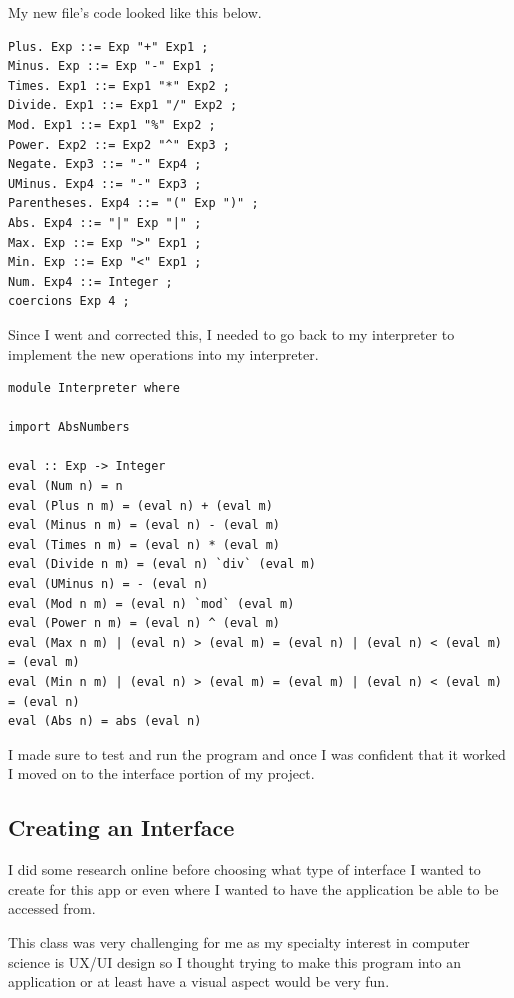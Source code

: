 \documentclass{article}
\begin{document}
\medskip\noindent 
My new file's code looked like this below. 

\medskip\noindent 
\begin{lstlisting}
Plus. Exp ::= Exp "+" Exp1 ;
Minus. Exp ::= Exp "-" Exp1 ;
Times. Exp1 ::= Exp1 "*" Exp2 ;
Divide. Exp1 ::= Exp1 "/" Exp2 ;
Mod. Exp1 ::= Exp1 "%" Exp2 ;
Power. Exp2 ::= Exp2 "^" Exp3 ;
Negate. Exp3 ::= "-" Exp4 ;
UMinus. Exp4 ::= "-" Exp3 ;
Parentheses. Exp4 ::= "(" Exp ")" ;
Abs. Exp4 ::= "|" Exp "|" ;
Max. Exp ::= Exp ">" Exp1 ;
Min. Exp ::= Exp "<" Exp1 ;
Num. Exp4 ::= Integer ;
coercions Exp 4 ;
\end{lstlisting}

\medskip\noindent 
Since I went and corrected this, I needed to go back to my interpreter to implement the new operations into my interpreter. 

\medskip\noindent 
\begin{lstlisting}
module Interpreter where

import AbsNumbers

eval :: Exp -> Integer
eval (Num n) = n
eval (Plus n m) = (eval n) + (eval m)
eval (Minus n m) = (eval n) - (eval m)
eval (Times n m) = (eval n) * (eval m)
eval (Divide n m) = (eval n) `div` (eval m)
eval (UMinus n) = - (eval n)
eval (Mod n m) = (eval n) `mod` (eval m)
eval (Power n m) = (eval n) ^ (eval m)
eval (Max n m) | (eval n) > (eval m) = (eval n) | (eval n) < (eval m) = (eval m)
eval (Min n m) | (eval n) > (eval m) = (eval m) | (eval n) < (eval m) = (eval n)
eval (Abs n) = abs (eval n)
\end{lstlisting}

\medskip\noindent
I made sure to test and run the program and once I was confident that it worked I moved on to the interface portion of my project.

\subsection{Creating an Interface}

\medskip\noindent
I did some research online before choosing what type of interface I wanted to create for this app or even where I wanted to have the application be able to be accessed from. 

\medskip\noindent
This class was very challenging for me as my specialty interest in computer science is UX/UI design so I thought trying to make this program into an application or at least have a visual aspect would be very fun.
\end{document}
